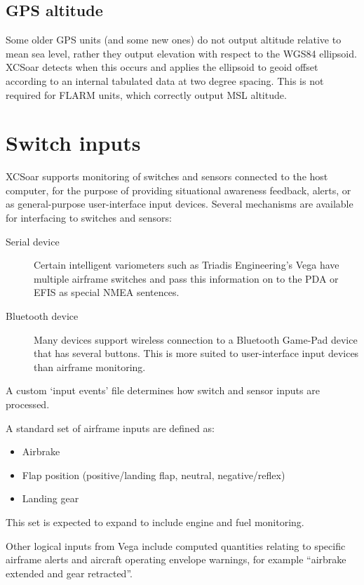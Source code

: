 \subsection*{GPS altitude}

Some older GPS units (and some new ones) do not output altitude
relative to mean sea level, rather they output elevation with respect
to the WGS84 ellipsoid.  XCSoar detects when this occurs and applies
the ellipsoid to geoid offset according to an internal tabulated data
at two degree spacing.  This is not required for FLARM units,
which correctly output MSL altitude.

\section{Switch inputs}

XCSoar supports monitoring of switches and sensors connected to the
host computer, for the purpose of providing situational awareness
feedback, alerts, or as general-purpose user-interface input devices.
Several mechanisms are available for interfacing to switches and
sensors:
\begin{description}
\item[Serial device]  Certain intelligent variometers such as
 Triadis Engineering's Vega have multiple airframe switches
 and pass this information on to the PDA or EFIS as special
 NMEA sentences.
\item[Bluetooth device]  Many devices support wireless
 connection to a Bluetooth Game-Pad device that has several buttons.
 This is more suited to user-interface input devices than airframe
 monitoring.
\end{description}

A custom `input events' file determines how switch and sensor
inputs are processed.

A standard set of airframe inputs are defined as:
\begin{itemize}
\item Airbrake
\item Flap position (positive/landing flap, neutral, negative/reflex)
\item Landing gear
\end{itemize}

This set is expected to expand to include engine and fuel monitoring.

Other logical inputs from Vega include computed quantities relating to
specific airframe alerts and aircraft operating envelope warnings, for
example ``airbrake extended and gear retracted''.  

